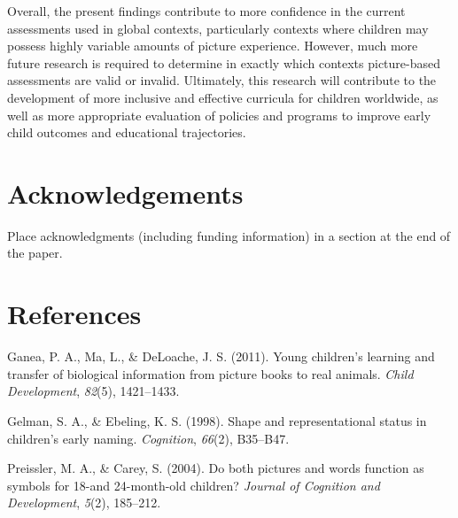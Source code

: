 \documentclass[10pt, letterpaper]{article}
\begin{document}
Overall, the present findings contribute to more confidence in the
current assessments used in global contexts, particularly contexts where
children may possess highly variable amounts of picture experience.
However, much more future research is required to determine in exactly
which contexts picture-based assessments are valid or invalid.
Ultimately, this research will contribute to the development of more
inclusive and effective curricula for children worldwide, as well as
more appropriate evaluation of policies and programs to improve early
child outcomes and educational trajectories.

\section{Acknowledgements}\label{acknowledgements}

Place acknowledgments (including funding information) in a section at
the end of the paper.

\section{References}\label{references}

\setlength{\parindent}{-0.1in} 
\setlength{\leftskip}{0.125in}

\noindent

\label{refs}
\begin{CSLReferences}{1}{0}
Ganea, P. A., Ma, L., \& DeLoache, J. S. (2011). Young children's
learning and transfer of biological information from picture books to
real animals. \emph{Child Development}, \emph{82}(5), 1421--1433.

Gelman, S. A., \& Ebeling, K. S. (1998). Shape and representational
status in children's early naming. \emph{Cognition}, \emph{66}(2),
B35--B47.

Preissler, M. A., \& Carey, S. (2004). Do both pictures and words
function as symbols for 18-and 24-month-old children? \emph{Journal of
Cognition and Development}, \emph{5}(2), 185--212.

\end{CSLReferences}


\end{document}
